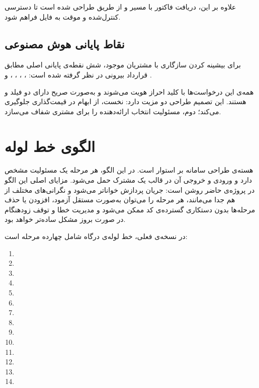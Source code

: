 علاوه بر این، دریافت  فاکتور با مسیر 
و از طریق  طراحی شده است تا دسترسی کنترل‌شده
و موقت به فایل فراهم شود.

\subsection{نقاط پایانی هوش مصنوعی}

برای بیشینه کردن سازگاری با مشتریان موجود، شش نقطه‌ی پایانی اصلی مطابق
قرارداد بیرونی  در نظر گرفته شده است: ،
، ،
،  و
.

همه‌ی این درخواست‌ها با کلید  احراز هویت می‌شوند و به‌صورت صریح
دارای دو فیلد  و  هستند. این تصمیم طراحی دو
مزیت دارد: نخست، از ابهام در قیمت‌گذاری جلوگیری می‌کند؛ دوم، مسئولیت
انتخاب ارائه‌دهنده را برای مشتری شفاف می‌سازد.

\section{الگوی خط لوله}

هسته‌ی طراحی سامانه بر  استوار است.
در این الگو، هر مرحله یک مسئولیت مشخص دارد و ورودی و خروجی آن در قالب
یک  مشترک حمل می‌شود. مزایای اصلی
این الگو در پروژه‌ی حاضر روشن است: جریان پردازش خواناتر می‌شود و
نگرانی‌های مختلف از هم جدا می‌مانند، هر مرحله را می‌توان به‌صورت مستقل
آزمود، افزودن یا حذف مرحله‌ها بدون دستکاری گسترده‌ی کد ممکن می‌شود و
مدیریت خطا و توقف زودهنگام در صورت بروز مشکل ساده‌تر خواهد بود.

در نسخه‌ی فعلی، خط لوله‌ی درگاه شامل چهارده مرحله است:

\begin{enumerate}
  \item {}
  \item {}
  \item {}
  \item {}
  \item {}
  \item {}
  \item {}
  \item {}
  \item {}
  \item {}
  \item {}
  \item {}
  \item {}
  \item {}
\end{enumerate}

